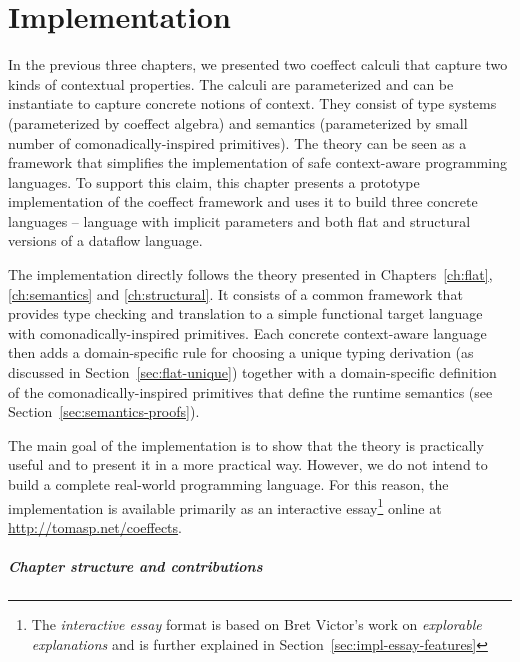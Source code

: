 
\chapter{Implementation}
\label{ch:impl}

In the previous three chapters, we presented two coeffect calculi that capture two kinds of
contextual properties. The calculi are parameterized and can be instantiate to capture concrete
notions of context. They consist of type systems (parameterized by coeffect algebra) and semantics
(parameterized by small number of comonadically-inspired primitives). The theory can be seen as
a framework that simplifies the implementation of safe context-aware programming languages. To
support this claim, this chapter presents a prototype implementation of the coeffect framework and
uses it to build three concrete languages -- language with implicit parameters and both flat and
structural versions of a dataflow language.

The implementation directly follows the theory presented in Chapters~\ref{ch:flat}, \ref{ch:semantics}
and \ref{ch:structural}. It consists of a common framework that provides type checking and
translation to a simple functional target language with comonadically-inspired primitives. Each
concrete context-aware language then adds a domain-specific rule for choosing a unique typing
derivation (as discussed in Section~\ref{sec:flat-unique}) together with a domain-specific
definition of the comonadically-inspired primitives that define the runtime semantics
(see Section~\ref{sec:semantics-proofs}).

The main goal of the implementation is to show that the theory is practically useful and to present it
in a more practical way. However, we do not intend to build a complete real-world programming language.
For this reason, the implementation is available primarily as an interactive essay\footnote{The
\emph{interactive essay} format is based on Bret Victor's work on \emph{explorable explanations} \cite{essay-explorable}
and is further explained in Section~\ref{sec:impl-essay-features}} online at \url{http://tomasp.net/coeffects}.

\paragraph{Chapter structure and contributions}

